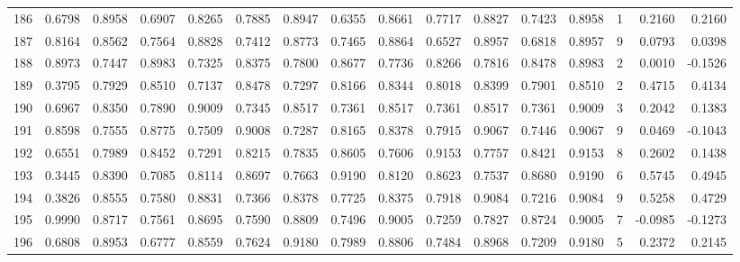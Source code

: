 \begin{tabular}{lrrrrrrrrrrrrrrr}
186 &      0.6798 &  0.8958 &  0.6907 &  0.8265 &  0.7885 &  0.8947 &  0.6355 &  0.8661 &  0.7717 &  0.8827 &   0.7423 &     0.8958 &      1 &                    0.2160 &                     0.2160 \\
187 &      0.8164 &  0.8562 &  0.7564 &  0.8828 &  0.7412 &  0.8773 &  0.7465 &  0.8864 &  0.6527 &  0.8957 &   0.6818 &     0.8957 &      9 &                    0.0793 &                     0.0398 \\
188 &      0.8973 &  0.7447 &  0.8983 &  0.7325 &  0.8375 &  0.7800 &  0.8677 &  0.7736 &  0.8266 &  0.7816 &   0.8478 &     0.8983 &      2 &                    0.0010 &                    -0.1526 \\
189 &      0.3795 &  0.7929 &  0.8510 &  0.7137 &  0.8478 &  0.7297 &  0.8166 &  0.8344 &  0.8018 &  0.8399 &   0.7901 &     0.8510 &      2 &                    0.4715 &                     0.4134 \\
190 &      0.6967 &  0.8350 &  0.7890 &  0.9009 &  0.7345 &  0.8517 &  0.7361 &  0.8517 &  0.7361 &  0.8517 &   0.7361 &     0.9009 &      3 &                    0.2042 &                     0.1383 \\
191 &      0.8598 &  0.7555 &  0.8775 &  0.7509 &  0.9008 &  0.7287 &  0.8165 &  0.8378 &  0.7915 &  0.9067 &   0.7446 &     0.9067 &      9 &                    0.0469 &                    -0.1043 \\
192 &      0.6551 &  0.7989 &  0.8452 &  0.7291 &  0.8215 &  0.7835 &  0.8605 &  0.7606 &  0.9153 &  0.7757 &   0.8421 &     0.9153 &      8 &                    0.2602 &                     0.1438 \\
193 &      0.3445 &  0.8390 &  0.7085 &  0.8114 &  0.8697 &  0.7663 &  0.9190 &  0.8120 &  0.8623 &  0.7537 &   0.8680 &     0.9190 &      6 &                    0.5745 &                     0.4945 \\
194 &      0.3826 &  0.8555 &  0.7580 &  0.8831 &  0.7366 &  0.8378 &  0.7725 &  0.8375 &  0.7918 &  0.9084 &   0.7216 &     0.9084 &      9 &                    0.5258 &                     0.4729 \\
195 &      0.9990 &  0.8717 &  0.7561 &  0.8695 &  0.7590 &  0.8809 &  0.7496 &  0.9005 &  0.7259 &  0.7827 &   0.8724 &     0.9005 &      7 &                   -0.0985 &                    -0.1273 \\
196 &      0.6808 &  0.8953 &  0.6777 &  0.8559 &  0.7624 &  0.9180 &  0.7989 &  0.8806 &  0.7484 &  0.8968 &   0.7209 &     0.9180 &      5 &                    0.2372 &                     0.2145 \\

\end{tabular}
